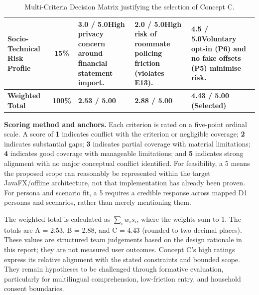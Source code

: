 \documentclass[12pt, a4paper]{article}
\begin{document}
\begin{table}[H]
\begin{tabularx}{\textwidth}{@{} >{\bfseries}p{3.0cm} c X X X @{}}
Socio-Technical Risk Profile & 15\% & \textbf{3.0 / 5.0}\newline High privacy concern around financial statement import. & \textbf{2.0 / 5.0}\newline High risk of roommate policing friction (violates E13). & \textbf{4.5 / 5.0}\newline Voluntary opt-in (P6) and no fake offsets (P5) minimise risk. \\
\midrule
\textbf{Weighted Total} & \textbf{100\%} & \textbf{2.53 / 5.00} & \textbf{2.88 / 5.00} & \textbf{4.43 / 5.00 (Selected)} \\
\bottomrule
\end{tabularx}

\caption{Multi-Criteria Decision Matrix justifying the selection of Concept C.}


\label{tab:mcdm}
\end{table}

\textbf{Scoring method and anchors.} Each criterion is rated on a five-point ordinal scale. A score of \textbf{1} indicates conflict with the criterion or negligible coverage; \textbf{2} indicates substantial gaps; \textbf{3} indicates partial coverage with material limitations; \textbf{4} indicates good coverage with manageable limitations; and \textbf{5} indicates strong alignment with no major conceptual conflict identified. For feasibility, a 5 means the proposed scope can reasonably be represented within the target JavaFX/offline architecture, not that implementation has already been proven. For persona and scenario fit, a 5 requires a credible response across mapped D1 personas and scenarios, rather than merely mentioning them.

The weighted total is calculated as $\sum_i w_i s_i$, where the weights sum to 1. The totals are A = 2.53, B = 2.88, and C = 4.43 (rounded to two decimal places). These values are structured team judgements based on the design rationale in this report; they are not measured user outcomes. Concept C's high ratings express its relative alignment with the stated constraints and bounded scope. They remain hypotheses to be challenged through formative evaluation, particularly for multilingual comprehension, low-friction entry, and household consent boundaries.

\newpage

\end{document}
